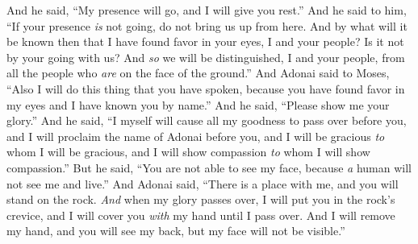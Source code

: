 \begin{biblechapter}
\verse And he said, “My presence will go, and I will give you rest.”
\verse And he said to him, “If your presence \textit{is} not going, do not bring us up from here.
\verse And by what will it be known then that I have found favor in your eyes, I and your people? Is it not by your going with us? And \textit{so} we will be distinguished, I and your people, from all the people who \textit{are} on the face of the ground.”
\verse And Adonai said to Moses, “Also I will do this thing that you have spoken, because you have found favor in my eyes and I have known you by name.”
\verse And he said, “Please show me your glory.”
\verse And he said, “I myself will cause all my goodness to pass over before you, and I will proclaim the name of Adonai before you, and I will be gracious \textit{to} whom I will be gracious, and I will show compassion \textit{to} whom I will show compassion.”
\verse But he said, “You are not able to see my face, because \textit{a} human will not see me and live.”
\verse And Adonai said, “There is a place with me, and you will stand on the rock.
\verse \textit{And} when my glory passes over, I will put you in the rock’s crevice, and I will cover you \textit{with} my hand until I pass over.
\verse And I will remove my hand, and you will see my back, but my face will not be visible.”
\end{biblechapter}

